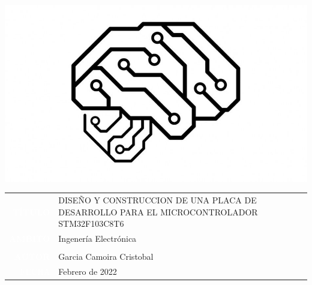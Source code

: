 \documentclass[10pt,a4paper,oneside]{article}
\begin{document}
\pagestyle{empty}

\begin{center} 
\includegraphics[scale=0.4]{Imagenes/PCB_Brain_circuit.png} 
\end{center}

\large

\vspace{3cm}

\begin{center}
{\setlength\arrayrulewidth{2pt}
\begin{tabular}{r|p{9.8cm}}
\arrayrulecolor{udc}
\colorbox{udc}{\textcolor{white}{\bf TÍTULO}}      
&	DISEÑO Y CONSTRUCCION DE UNA PLACA DE DESARROLLO PARA EL MICROCONTROLADOR STM32F103C8T6  \\[2cm]
\colorbox{udc}{\textcolor{white}{\bf AMBITO}}       & Ingenería Electrónica    \\[1cm]
\colorbox{udc}{\textcolor{white}{\bf }}  &      \\[2cm]
\colorbox{udc}{\textcolor{white}{\bf AUTOR}}  &	Garcia Camoira Cristobal  \\[2cm]
\colorbox{udc}{\textcolor{white}{FECHA}}       &	Febrero de 2022
\end{tabular}}
\end{center}
\normalsize
\cleardoublepage
\end{document}
